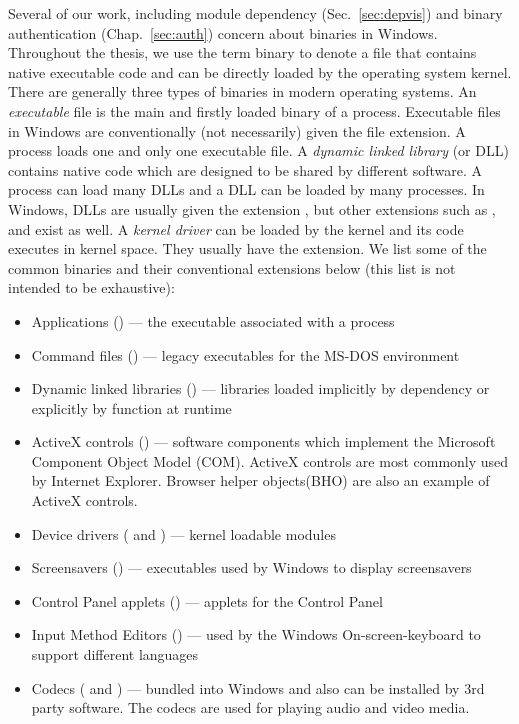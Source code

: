 Several of our work, including module dependency (Sec.~\ref{sec:depvis})
and binary authentication (Chap.~\ref{sec:auth}) concern about binaries in Windows.
Throughout the thesis, we use the term binary to denote a file that contains
native executable code and can be directly loaded by the operating system kernel.
There are generally three types of binaries in modern operating systems.
An {\em executable} file is the main and firstly loaded binary of a process.
Executable files in Windows are conventionally (not necessarily)
given the  file extension.
A process loads one and only one executable file.
A {\em dynamic linked library} (or DLL) contains native code which are designed
to be shared by different software.
A process can load many DLLs and a DLL can be loaded by many processes.
In Windows, DLLs are usually given the extension , but other extensions
such as ,  and  exist as well.
A {\em kernel driver} can be loaded by the kernel and its code executes in kernel
space.
They usually have the  extension.
We list some of the common binaries and their conventional extensions below
(this list is not intended to be exhaustive):

\begin{itemize}
\item Applications () ---
the executable associated with a process
\item Command files () ---
legacy executables for the MS-DOS environment
\item Dynamic linked libraries () ---
libraries loaded implicitly by dependency or
explicitly by  function at runtime
\item ActiveX controls () ---
software components which
implement the Microsoft Component Object Model (COM). 
ActiveX controls are most commonly used by Internet Explorer.
Browser helper objects(BHO) are also
an example of ActiveX controls.
\item Device drivers ( and ) ---
kernel loadable modules
\item Screensavers () ---
executables used by Windows to display screensavers
\item Control Panel applets () ---
applets for the Control Panel
\item Input Method Editors () ---
used by the Windows On-screen-keyboard to support different languages
\item Codecs ( and ) ---
bundled into Windows and also can be installed by 3rd party software.
The codecs are used for playing audio and video media.
\end{itemize}

